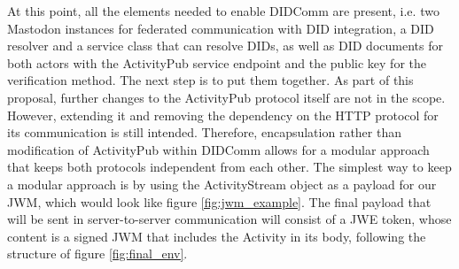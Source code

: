 

At this point, all the elements needed to enable DIDComm are present, i.e. two Mastodon instances for federated communication with DID integration, a DID resolver and a service class that can resolve DIDs, as well as DID documents for both actors with the ActivityPub service endpoint and the public key for the verification method. The next step is to put them together. As part of this proposal, further changes to the ActivityPub protocol itself are not in the scope. However, extending it and removing the dependency on the HTTP protocol for its communication is still intended. Therefore, encapsulation rather than modification of ActivityPub within DIDComm allows for a modular approach that keeps both protocols independent from each other. The simplest way to keep a modular approach is by using the ActivityStream object as a payload for our JWM, which would look like figure \ref{fig:jwm_example}. 
The final payload that will be sent in server-to-server communication will consist of a JWE token, whose content is a signed JWM that includes the Activity in its body, following the structure of figure \ref{fig:final_env}.

